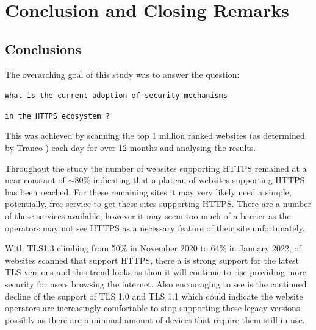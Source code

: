 \documentclass{mscreport}
\begin{document}
\clearpage
\newpage

%

\chapter{Conclusion and Closing Remarks}
\label{chap:conclusion}

\section{Conclusions}

\noindent
The overarching goal of this study was to answer the question:

\vspace{0.6cm} \noindent
\centerline{\texttt{What is the current adoption of security mechanisms}}
\centerline{\texttt{in the HTTPS ecosystem ?}}

\vspace{0.3cm} \noindent
This was achieved by scanning the top 1 million ranked websites (as determined by Tranco \cite{noauthor_undated-mt}) each day for over 12 months and analysing the results.

\vspace{0.3cm} \noindent
Throughout the study the number of websites supporting HTTPS remained at a near constant of $\sim$80\% indicating that a plateau of websites supporting HTTPS has been reached. For these remaining sites it may very likely need a simple, potentially, free service to get these sites supporting HTTPS. There are a number of these services available, however it may seem too much of a barrier as the operators may not see HTTPS as a necessary feature of their site unfortunately.

\vspace{0.3cm} \noindent
With TLS1.3 climbing from 50\% in November 2020 to 64\% in January 2022, of websites scanned that support HTTPS, there a is strong support for the latest TLS versions and this trend looks as thou it will continue to rise providing more security for users browsing the internet. Also encouraging to see is the continued decline of the support of TLS 1.0 and TLS 1.1 which could indicate the website operators are increasingly comfortable to stop supporting these legacy versions possibly as there are a minimal amount of devices that require them still in use.
\end{document}
